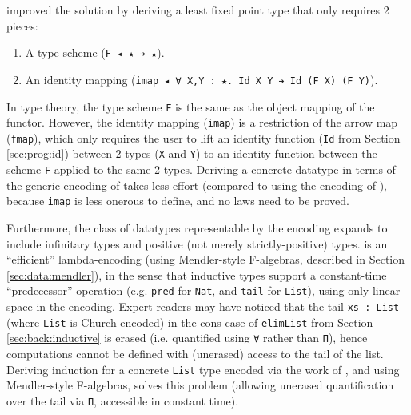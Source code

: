 \documentclass[acmsmall]{acmart}\settopmatter{}
\newcommand{\refsec}[1]{Section \ref{sec:#1}}
\begin{document}
\citet{firsov18b} improved the solution by deriving a
least fixed point type that only requires 2 pieces:
\begin{enumerate}
\item A type scheme (\verb;F ◂ ★ ➔ ★;).
\item An identity mapping
  (\verb;imap ◂ ∀ X,Y : ★. Id X Y ➔ Id (F X) (F Y);).
\end{enumerate}

In type theory, the type scheme \verb;F; is the same as the object
mapping of the functor. However, the identity mapping (\verb;imap;) is
a restriction of the arrow map (\verb;fmap;), which only requires the
user to lift an identity function
(\verb;Id; from \refsec{prog:id}) between 2 types
(\verb;X; and \verb;Y;) to an identity function
between the scheme \verb;F; applied to the same 2 types.
Deriving a concrete datatype in terms of the generic encoding of
\citet{firsov18b} takes less effort (compared to using the encoding of
\citet{firsov18a}), because \verb;imap; is less onerous to define, and no
laws need to be proved.

Furthermore, the class of datatypes representable by the
\citet{firsov18b} encoding expands to include infinitary types and
positive (not merely strictly-positive) types. \citet{firsov18b} is an
``efficient'' lambda-encoding (using Mendler-style F-algebras,
described in \refsec{data:mendler}), in the
sense that inductive types support a constant-time ``predecessor''
operation (e.g. \verb;pred; for \verb;Nat;, and \verb;tail; for
\verb;List;), using only linear space in the encoding.
Expert readers may have noticed that the tail \verb;xs : List;
(where \verb;List; is Church-encoded) in
the cons case of \verb;elimList; from \refsec{back:inductive} is
erased (i.e. quantified using \verb;∀; rather than \verb;Π;), hence
computations cannot be defined with (unerased) access to the tail of the
list. Deriving induction for a concrete \verb;List; type
encoded via the work of \citet{firsov18b},
and using Mendler-style F-algebras,
solves this problem (allowing unerased quantification over the tail
via \verb;Π;, accessible in constant time).
\end{document}
